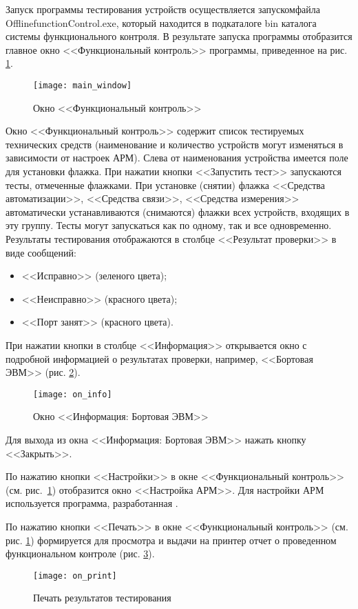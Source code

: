 Запуск программы тестирования устройств
осуществляется запуском\break файла OfflinefunctionControl.exe, который находится в
подкаталоге bin каталога системы функционального контроля.
В результате запуска программы отобразится главное окно <<Функциональный контроль>> программы, приведенное на рис.
\ref{fig:guide:user_guide:func:main_window}.
\begin{figure}[htb]
	\centering
	\texttt{[image: main\_window]}
	\caption{Окно <<Функциональный контроль>>}
	\label{fig:guide:user_guide:func:main_window}
\end{figure}

Окно <<Функциональный контроль>> содержит список тестируемых технических средств
(наименование и количество устройств могут изменяться в зависимости от настроек АРМ).
Слева от наименования устройства имеется поле для установки флажка.
При нажатии кнопки <<Запустить тест>> запускаются тесты, отмеченные флажками.
При установке (снятии) флажка <<Средства автоматизации>>, <<Средства связи>>,
<<Средства измерения>> автоматически
устанавливаются (снимаются) флажки всех устройств, входящих в эту группу.
Тесты могут запускаться как по одному, так и все одновременно.
Результаты тестирования отображаются в столбце <<Результат проверки>> в виде сообщений:
\begin{itemize}
		\item <<Исправно>> (зеленого цвета);
		\item <<Неисправно>> (красного цвета);
		\item <<Порт занят>> (красного цвета).
\end{itemize}

При нажатии кнопки в столбце <<Информация>> открывается окно с подробной информацией о результатах проверки,
например, <<Бортовая ЭВМ>> (рис. \ref{fig:guide:user_guide:func:on_info}).
\begin{figure}
	\centering
	\texttt{[image: on\_info]}
	\caption{Окно <<Информация: Бортовая ЭВМ>>}
	\label{fig:guide:user_guide:func:on_info}
\end{figure}
Для выхода из окна <<Информация: Бортовая ЭВМ>> нажать кнопку <<Закрыть>>.

По нажатию кнопки <<Настройки>> в окне <<Функциональный контроль>> (см.
рис.~\ref{fig:guide:user_guide:func:main_window}) отобразится окно <<Настройка АРМ>>. Для настройки АРМ используется
программа, разработанная \company.

По нажатию кнопки <<Печать>> в окне <<Функциональный контроль>>
(см. рис. \ref{fig:guide:user_guide:func:main_window}) формируется для просмотра и выдачи на принтер отчет
о проведенном функциональном контроле (рис. \ref{fig:guide:user_guide:func:on_print}).
\begin{figure}
	\centering
	\texttt{[image: on\_print]}
	\caption{Печать результатов тестирования}
	\label{fig:guide:user_guide:func:on_print}
\end{figure}

